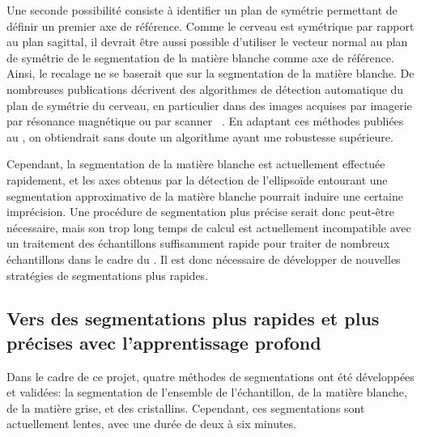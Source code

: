 \documentclass[\main/main.tex]{subfiles}
\begin{document}
%
Une seconde possibilité consiste à identifier un plan de symétrie permettant de définir un premier axe de référence.
%
Comme le cerveau est symétrique par rapport au plan sagittal, il devrait être aussi possible d'utiliser le vecteur normal au plan de symétrie de le segmentation de la matière blanche comme axe de référence. Ainsi, le recalage ne se baserait que sur la segmentation de la matière blanche.
%
De nombreuses publications décrivent des algorithmes de détection automatique du plan de symétrie du cerveau, en particulier dans des images acquises par imagerie par résonance magnétique ou par scanner ~\cite{tan_2019,noori_2020,rehman_2018}. En adaptant ces méthodes publiées au \pz{}, on obtiendrait sans doute un algorithme ayant une robustesse supérieure.

%
Cependant, la segmentation de la matière blanche est actuellement effectuée  rapidement, et les axes obtenus par la détection de l'ellipsoïde entourant une segmentation approximative de la matière blanche pourrait induire une certaine imprécision. Une procédure de segmentation plus précise serait donc peut-être nécessaire, mais son trop long temps de calcul est actuellement incompatible avec un traitement des échantillons suffisamment rapide pour traiter de nombreux échantillons dans le cadre du \hcs{}.
Il est donc nécessaire de développer de nouvelles stratégies de segmentations plus rapides.

    \subsection{Vers des segmentations plus rapides et plus précises avec l'apprentissage profond}

%    
Dans le cadre de ce projet, quatre méthodes de segmentations ont été développées et validées: la segmentation de l'ensemble de l'échantillon, de la matière blanche, de la matière grise, et des cristallins.
%
Cependant, ces segmentations sont actuellement lentes, avec une durée de deux à six minutes.
\end{document}
